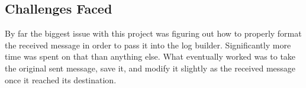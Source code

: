\documentclass[12pt, oneside]{article}   	%
\begin{document}
\begin{twocolumn}
\section{Challenges Faced}

By far the biggest issue with this project was figuring out how to properly format the received message in order to pass it into the log builder.  Significantly more time was spent on that than anything else.  What eventually worked was to take the original sent message, save it, and modify it slightly as the received message once it reached its destination.

\end{twocolumn}
\end{document}
